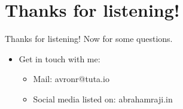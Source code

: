 \documentclass[presentation]{beamer}
\begin{document}
\section*{Thanks for listening!}
\label{sec:org81da261}
\begin{frame}[label={sec:org13eae75}]{Thanks for listening! Now for some questions.}
\begin{itemize}
\item Get in touch with me:
\begin{itemize}
\item Mail: avronr@tuta.io
\item Social media listed on: abrahamraji.in
\end{itemize}
\end{itemize}
\end{frame}
\end{document}
